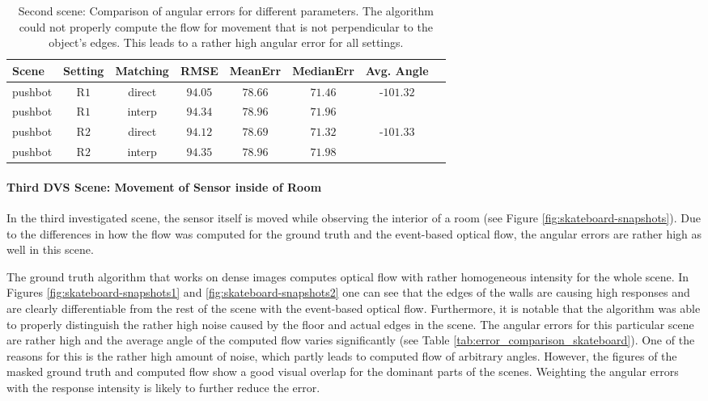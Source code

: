 \begin{table}[tb]
	\centering
		\begin{tabular}{lccccccc}
Scene & Setting & Matching & RMSE & MeanErr & MedianErr & Avg. Angle \\
\hline  \hline
pushbot & R$1$ & direct & $94.05$ & $78.66$ & $71.46$ & -$101.32$ & \\
pushbot & R$1$ & interp & $94.34$ & $78.96$ & $71.96$ &  & \\
pushbot & R$2$ & direct & $94.12$ & $78.69$ & $71.32$ & -$101.33$ & \\
pushbot & R$2$ & interp & $94.35$ & $78.96$ & $71.98$ &  & \\
		\end{tabular}
	\caption[Second scene: Comparison of angular errors for different parameters.]{Second scene: Comparison of angular errors for different parameters. The algorithm could not properly compute the flow for movement that is not perpendicular to the object's edges. This leads to a rather high angular error for all settings.}
	\label{tab:error_comparison_pushbot}
\end{table}

\paragraph{Third DVS Scene: Movement of Sensor inside of Room}

In the third investigated scene, the sensor itself is moved while observing the interior of a room (see Figure \ref{fig:skateboard-snapshots}). 
Due to the differences in how the flow was computed for the ground truth and the event-based optical flow, the angular errors are rather high as well in this scene.

The ground truth algorithm that works on dense images computes optical flow with rather homogeneous intensity for the whole scene.
In Figures \ref{fig:skateboard-snapshots1} and \ref{fig:skateboard-snapshots2} one can see that the edges of the walls are causing high responses and are clearly differentiable from the rest of the scene with the event-based optical flow.
Furthermore, it is notable that the algorithm was able to properly distinguish the rather high noise caused by the floor and actual edges in the scene.
The angular errors for this particular scene are rather high and the average angle of the computed flow varies significantly (see Table \ref{tab:error_comparison_skateboard}). 
One of the reasons for this is the rather high amount of noise, which partly leads to computed flow of arbitrary angles.
However, the figures of the masked ground truth and computed flow show a good visual overlap for the dominant parts of the scenes.
Weighting the angular errors with the response intensity is likely to further reduce the error.



